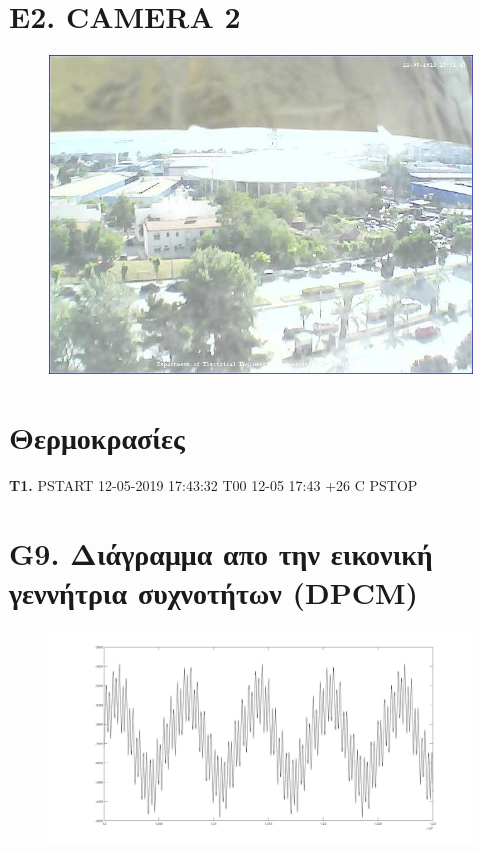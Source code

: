 \documentclass{article}
\begin{document}
\section*{E2. CAMERA 2}

\begin{figure}[h!]
 \begin{center}
 \advance\leftskip-4cm
  \includegraphics[width=200mm,scale=0.7]{pic2s2.jpeg}
   
  
\end{center}
\end{figure}
\newpage
\section*{Θερμοκρασίες}
\textbf{Τ1.} PSTART 12-05-2019 17:43:32 T00 12-05 17:43 +26 C PSTOP
\section*{G9. Διάγραμμα απο την εικονική γεννήτρια συχνοτήτων (DPCM)}
\begin{figure}[h!]
 \begin{center}
 \advance\leftskip-4cm
  \includegraphics[width=200mm,scale=0.7]{g9s2.jpg}
\end{center}
\end{figure}
\newpage
\end{document}
